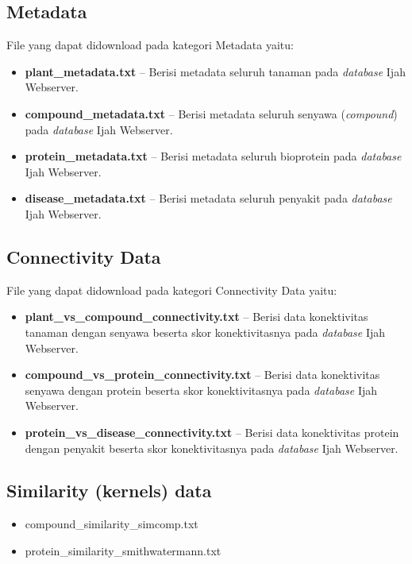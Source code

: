 \subsection{Metadata}
File yang dapat didownload pada kategori Metadata yaitu:

\begin{itemize}
\item \textbf{plant\_metadata.txt} -- Berisi metadata seluruh tanaman pada \emph{database} Ijah Webserver. 
\item \textbf{compound\_metadata.txt} -- Berisi metadata seluruh senyawa (\emph{compound}) pada \emph{database} Ijah Webserver.
\item \textbf{protein\_metadata.txt} -- Berisi metadata seluruh bioprotein pada \emph{database} Ijah Webserver.
\item \textbf{disease\_metadata.txt} -- Berisi metadata seluruh penyakit pada \emph{database} Ijah Webserver.
\end{itemize}

\subsection{Connectivity Data}
File yang dapat didownload pada kategori Connectivity Data yaitu:

\begin{itemize}
\item \textbf{plant\_vs\_compound\_connectivity.txt} -- Berisi data konektivitas tanaman dengan senyawa beserta skor konektivitasnya pada \emph{database} Ijah Webserver.
\item \textbf{compound\_vs\_protein\_connectivity.txt} -- Berisi data konektivitas senyawa dengan protein beserta skor konektivitasnya pada \emph{database} Ijah Webserver.
\item \textbf{protein\_vs\_disease\_connectivity.txt} -- Berisi data konektivitas protein dengan penyakit beserta skor konektivitasnya pada \emph{database} Ijah Webserver.
\end{itemize}

\subsection{Similarity (kernels) data}
\begin{itemize}
\item compound\_similarity\_simcomp.txt  
\item protein\_similarity\_smithwatermann.txt  
\end{itemize}


